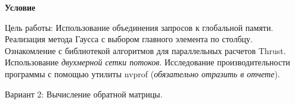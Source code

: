 \textbf{\large Условие}

Цель работы: Использование объединения запросов к глобальной памяти. Реализация метода Гаусса с выбором главного элемента по столбцу. Ознакомление с библиотекой алгоритмов для параллельных расчетов Thrust. Использование \textit{двухмерной сетки потоков}. Исследование производительности программы с помощью утилиты nvprof (\textit{обязательно отразить в отчете}).

Вариант 2: Вычисление обратной матрицы.

